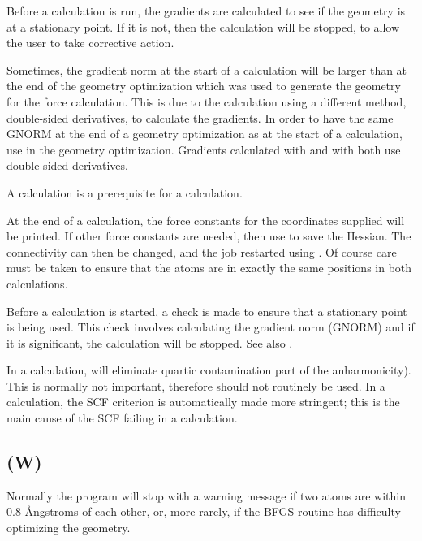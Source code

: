 Before a  calculation is run, the gradients are calculated to
see if the geometry is at a stationary point.  If it is not, then the
calculation will be stopped, to allow the user to take corrective action.

Sometimes, the gradient norm at the start of a  calculation will
be larger than at the end of the geometry optimization which was used to
generate the geometry for the force calculation. This is due to the 
calculation using a different method, double-sided derivatives, to calculate
the gradients.  In order to have the same GNORM at the end of a geometry
optimization as at the start of a  calculation, use 
in the geometry optimization.  Gradients calculated with  and
with  both use double-sided derivatives.

A  calculation is a prerequisite for a  calculation.

At the end of a  calculation, the force constants for the coordinates
supplied will be printed.  If other force constants are needed, then use
 to save the Hessian.  The connectivity can then be changed, and
the job restarted using .  Of course care must be taken to ensure
that the atoms are in exactly the same positions in both calculations.

Before a  calculation is started, a check  is  made  to  ensure
that  a  stationary point is being used.  This check involves calculating
the gradient norm (GNORM) and if it is significant,  the calculation will
be stopped.
See also .

In a  calculation,  will eliminate quartic contamination
part  of  the anharmonicity).  This is normally not important, therefore
 should not routinely be used.  In a   calculation,  the  SCF
criterion is automatically made more stringent; this is the main cause of
the SCF failing in a  calculation.
\subsection*{ (W)}
Normally the program will stop with a warning message if  two  atoms
are within $0.8$ \AA ngstroms of each other, or, more rarely, if the BFGS routine
has difficulty optimizing the geometry.

